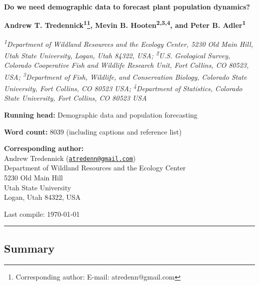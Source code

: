 \documentclass[12pt,]{article}
\title{}
\author{}
\date{}
\let\rmarkdownfootnote\footnote%
\def\footnote{\protect\rmarkdownfootnote}
\begin{document}

\textsf{\LARGE{\textbf{Do we need demographic data to forecast plant population dynamics?}}}

\renewcommand*{\thefootnote}{\fnsymbol{footnote}}

\vspace{1em}

\textsf{\normalsize{\textbf{Andrew T. Tredennick\textsuperscript{1}\footnote{Corresponding author: E-mail: atredenn@gmail.com}, Mevin B. Hooten\textsuperscript{2,3,4}, and Peter B. Adler\textsuperscript{1}}}}

\vspace{1em}

\textsf{\textit{\footnotesize{\textsuperscript{1}Department of Wildland Resources and the Ecology Center, 5230 Old Main Hill, Utah State University, Logan, Utah 84322, USA; \textsuperscript{2}U.S. Geological Survey, Colorado Cooperative Fish and Wildlife Research Unit, Fort Collins, CO 80523, USA; \textsuperscript{3}Department of Fish, Wildlife, and Conservation Biology, Colorado State University, Fort Collins, CO 80523 USA}; \textsuperscript{4}Department of Statistics, Colorado State University, Fort Collins, CO 80523 USA}}

\textbf{Running head:} Demographic data and population forecasting

\textbf{Word count:} 8039 (including captions and reference list)

\textbf{Corresponding author:}\\
Andrew Tredennick
(\href{mailto:atredenn@gmail.com}{\nolinkurl{atredenn@gmail.com}})\\
Department of Wildland Resources and the Ecology Center\\
5230 Old Main Hill\\
Utah State University\\
Logan, Utah 84322, USA

Last compile: \today

\allsectionsfont{\normalfont\sffamily\bfseries}
\renewcommand*{\thefootnote}{\arabic{footnote}} \setcounter{footnote}{0}

\rule{\textwidth}{1pt}

\subsection{Summary}\label{summary}
\end{document}
